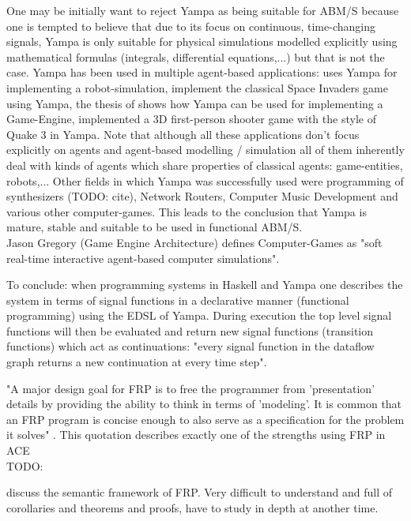 One may be initially want to reject Yampa as being suitable for ABM/S because one is tempted to believe that due to its focus on continuous, time-changing signals, Yampa is only suitable for physical simulations modelled explicitly using mathematical formulas (integrals, differential equations,...) but that is not the case. Yampa has been used in multiple agent-based applications: \cite{Hudak2003} uses Yampa for implementing a robot-simulation, \cite{Courtney2003} implement the classical Space Invaders game using Yampa, the thesis of \cite{Meisinger2010} shows how Yampa can be used for implementing a Game-Engine, \cite{Frag2005} implemented a 3D first-person shooter game with the style of Quake 3 in Yampa. Note that although all these applications don't focus explicitly on agents and agent-based modelling / simulation all of them inherently deal with kinds of agents which share properties of classical agents: game-entities, robots,... Other fields in which Yampa was successfully used were programming of synthesizers (TODO: cite), Network Routers, Computer Music Development and various other computer-games. This leads to the conclusion that Yampa is mature, stable and suitable to be used in functional ABM/S. \\
Jason Gregory (Game Engine Architecture) defines Computer-Games as "soft real-time interactive agent-based computer simulations".

To conclude: when programming systems in Haskell and Yampa one describes the system in terms of signal functions in a declarative manner (functional programming) using the EDSL of Yampa. During execution the top level signal functions will then be evaluated and return new signal functions (transition functions) which act as continuations: "every signal function in the dataflow graph returns a new continuation at every time step".

"A major design goal for FRP is to free the programmer from 'presentation' details by providing the ability to think in terms of 'modeling'. It is common that an FRP program is concise enough to also serve as a specification for the problem it solves" \cite{Wan2000}. This quotation describes exactly one of the strengths using FRP in ACE \\

TODO: \cite{perez_functional_2016}

\cite{Wan2000} discuss the semantic framework of FRP. Very difficult to understand and full of corollaries and theorems and proofs, have to study in depth at another time.


